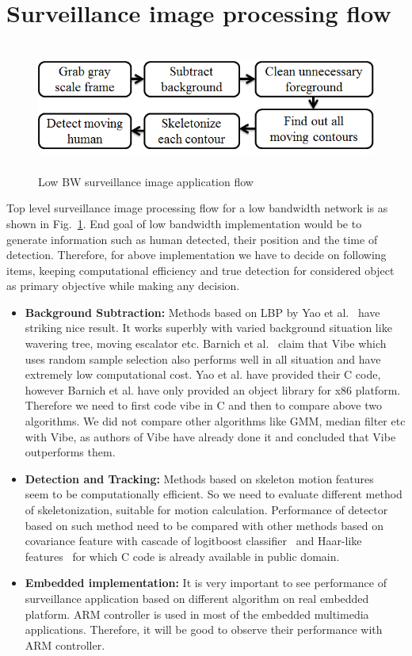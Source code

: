 \section{Surveillance image processing flow}
\begin{figure}[!b]
\centering
\includegraphics[height=120pt]{Figures/image_pipeline}
\caption{Low BW surveillance image application flow}
\label{image_pipeline}
\end{figure}
\indent Top level surveillance image processing flow for a low bandwidth
network is as shown in Fig.~\ref{image_pipeline}. End goal of low
bandwidth implementation would be to generate information such as human
detected, their position and the time of detection. Therefore, for above
implementation we have to decide on following items, keeping
computational efficiency and true detection for considered object as
primary objective while making any decision.\\
\begin{itemize}
\item \textbf{Background Subtraction:} Methods based on LBP by Yao et
 al.~\cite{11} have striking nice result. It works superbly with
 varied background situation like wavering tree, moving escalator
 etc. Barnich et al.~\cite{9} claim that Vibe which uses random
 sample selection also performs well in all situation and have
 extremely low computational cost. Yao et al. have provided their
 C code, however Barnich et al. have only provided an object
 library for x86 platform. Therefore we need to first code vibe
 in C and then to compare above two algorithms. We did not
 compare other algorithms like GMM, median filter etc with Vibe,
 as authors of Vibe have already done it and concluded that Vibe
 outperforms them.
\item \textbf{Detection and Tracking:} Methods based on skeleton motion
 features~\cite{32, 22, 31} seem to be computationally
 efficient. So we need to evaluate different method of
 skeletonization, suitable for motion calculation. Performance of
 detector based on such method need to be compared with other
 methods based on covariance feature with cascade of logitboost
 classifier~\cite{19} and Haar-like features~\cite{17} for
 which C code is already available in public domain.
\item \textbf{Embedded implementation:} It is very important to see
 performance of surveillance application based on different
 algorithm on real embedded platform. ARM controller is used in
 most of the embedded multimedia applications. Therefore, it will be
 good to observe their performance with ARM controller.
\end{itemize}
